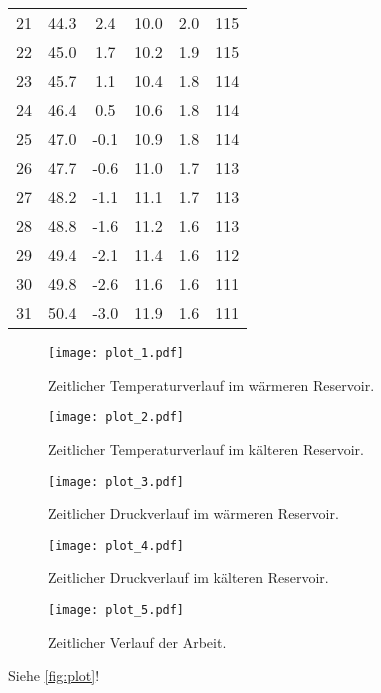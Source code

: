 \begin{table}[H]
\begin{tabular}{S[table-format=2.0] S S S S S[table-format=3.0]}
    21 & 44.3 &  2.4 & 10.0 & 2.0 & 115 \\
    22 & 45.0 &  1.7 & 10.2 & 1.9 & 115 \\
    23 & 45.7 &  1.1 & 10.4 & 1.8 & 114 \\
    24 & 46.4 &  0.5 & 10.6 & 1.8 & 114 \\
    25 & 47.0 & {-0.1} & 10.9 & 1.8 & 114 \\
    26 & 47.7 & {-0.6} & 11.0 & 1.7 & 113 \\
    27 & 48.2 & {-1.1} & 11.1 & 1.7 & 113 \\
    28 & 48.8 & {-1.6} & 11.2 & 1.6 & 113 \\
    29 & 49.4 & {-2.1} & 11.4 & 1.6 & 112 \\
    30 & 49.8 & {-2.6} & 11.6 & 1.6 & 111 \\
    31 & 50.4 & {-3.0} & 11.9 & 1.6 & 111 \\
    \bottomrule
  \end{tabular}
\end{table}



\begin{figure}
  \centering
  \texttt{[image: plot\_1.pdf]}
  \caption{Zeitlicher Temperaturverlauf im wärmeren Reservoir.}
  \label{fig:plot}
\end{figure}


\begin{figure}
  \centering
  \texttt{[image: plot\_2.pdf]}
  \caption{Zeitlicher Temperaturverlauf im kälteren Reservoir.}
  \label{fig:plot}
\end{figure}


\begin{figure}
  \centering
  \texttt{[image: plot\_3.pdf]}
  \caption{Zeitlicher Druckverlauf im wärmeren Reservoir.}
  \label{fig:plot}
\end{figure}


\begin{figure}
  \centering
  \texttt{[image: plot\_4.pdf]}
  \caption{Zeitlicher Druckverlauf im kälteren Reservoir.}
  \label{fig:plot}
\end{figure}


\begin{figure}
  \centering
  \texttt{[image: plot\_5.pdf]}
  \caption{Zeitlicher Verlauf der Arbeit.}
  \label{fig:plot}
\end{figure}


Siehe \autoref{fig:plot}!
